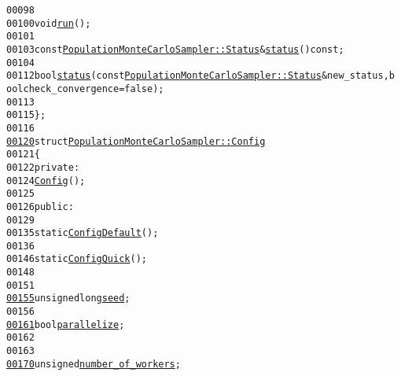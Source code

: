 \begin{footnotesize}
\begin{alltt}
00098 
00100             \textcolor{keywordtype}{void} \hyperlink{classeos_1_1PopulationMonteCarloSampler_a7df73b99d042f2b41a37e9acca29eebd}{run}();
00101 
00103             \textcolor{keyword}{const} \hyperlink{structeos_1_1PopulationMonteCarloSampler_1_1Status}{PopulationMonteCarloSampler::Status} & \hyperlink{classeos_1_1PopulationMonteCarloSampler_a0557e83dff8bc5befde6a43ede580f84}{status}() \textcolor{keyword}{const};
00104 
00112             \textcolor{keywordtype}{bool} \hyperlink{classeos_1_1PopulationMonteCarloSampler_a0557e83dff8bc5befde6a43ede580f84}{status}(\textcolor{keyword}{const} \hyperlink{structeos_1_1PopulationMonteCarloSampler_1_1Status}{PopulationMonteCarloSampler::Status} & new\_status, \textcolor{keywordtype}{b
      ool} check\_convergence = \textcolor{keyword}{false});
00113 
00115     \};
00116 
\hypertarget{population__monte__carlo__sampler_8hh_source_l00120}{}\hyperlink{structeos_1_1PopulationMonteCarloSampler_1_1Config}{00120}     \textcolor{keyword}{struct }\hyperlink{structeos_1_1PopulationMonteCarloSampler_1_1Config}{PopulationMonteCarloSampler::Config}
00121     \{
00122         \textcolor{keyword}{private}:
00124             \hyperlink{structeos_1_1PopulationMonteCarloSampler_1_1Config}{Config}();
00125 
00126         \textcolor{keyword}{public}:
00129 
00135             \textcolor{keyword}{static} \hyperlink{structeos_1_1PopulationMonteCarloSampler_1_1Config}{Config} \hyperlink{structeos_1_1PopulationMonteCarloSampler_1_1Config_a8f659cd4c289ebfea73765497eee01dd}{Default}();
00136 
00146             \textcolor{keyword}{static} \hyperlink{structeos_1_1PopulationMonteCarloSampler_1_1Config}{Config} \hyperlink{structeos_1_1PopulationMonteCarloSampler_1_1Config_aa88ccb299ca1bc2881951b82e6e66059}{Quick}();
00148 
00151 
\hypertarget{population__monte__carlo__sampler_8hh_source_l00155}{}\hyperlink{structeos_1_1PopulationMonteCarloSampler_1_1Config_abf7b1c768e283f8a41bc8b348bb84304}{00155}             \textcolor{keywordtype}{unsigned} \textcolor{keywordtype}{long} \hyperlink{structeos_1_1PopulationMonteCarloSampler_1_1Config_abf7b1c768e283f8a41bc8b348bb84304}{seed};
00156 
\hypertarget{population__monte__carlo__sampler_8hh_source_l00161}{}\hyperlink{structeos_1_1PopulationMonteCarloSampler_1_1Config_abe02d7abd41f52ae2eaf3eba25522f50}{00161}             \textcolor{keywordtype}{bool} \hyperlink{structeos_1_1PopulationMonteCarloSampler_1_1Config_abe02d7abd41f52ae2eaf3eba25522f50}{parallelize};
00162 
00163 
\hypertarget{population__monte__carlo__sampler_8hh_source_l00170}{}\hyperlink{structeos_1_1PopulationMonteCarloSampler_1_1Config_ae6362a7374c9ca1650b501c07672442a}{00170}             \textcolor{keywordtype}{unsigned} \hyperlink{structeos_1_1PopulationMonteCarloSampler_1_1Config_ae6362a7374c9ca1650b501c07672442a}{number_of_workers};

\end{alltt}
\end{footnotesize}
